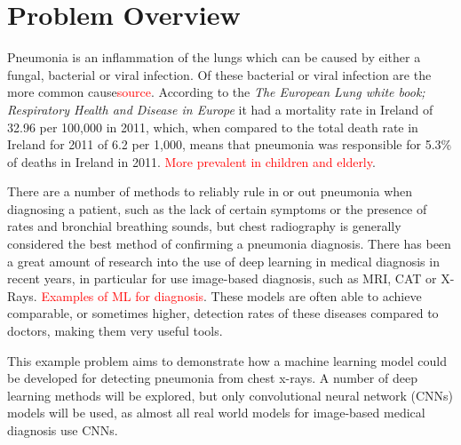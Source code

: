 \documentclass[12pt,a4paper,titlepage,twoside]{report}
\newcommand\todo[1]{\textcolor{red}{#1}}
\begin{document}
\section{Problem Overview}
	Pneumonia is an inflammation of the lungs which can be caused by either a fungal, bacterial or viral infection. Of these bacterial or viral infection are the more common cause\todo{source}. According to the \textit{The European Lung white book; Respiratory Health and Disease in Europe} it had a mortality rate in Ireland of 32.96 per 100,000 in 2011\cite{pne-death-rate}, which, when compared to the total death rate in Ireland for 2011 of 6.2 per 1,000, means that pneumonia was responsible for 5.3\% of deaths in Ireland in 2011. \todo{More prevalent in children and elderly}. \par
	There are a number of methods to reliably rule in or out pneumonia when diagnosing a patient, such as the lack of certain symptoms or the presence of rates and bronchial breathing sounds, but chest radiography is generally considered the best method of confirming a pneumonia diagnosis\cite{pne-diagnosis}. There has been a great amount of research into the use of deep learning in medical diagnosis in recent years, in particular for use image-based diagnosis, such as MRI, CAT or X-Rays\cite{pne-ml-in-medicine}. \todo{Examples of ML for diagnosis}. These models are often able to achieve comparable, or sometimes higher, detection rates of these diseases compared to doctors, making them very useful tools. \par
	This example problem aims to demonstrate how a machine learning model could be developed for detecting pneumonia from chest x-rays. A number of deep learning methods will be explored, but only convolutional neural network (CNNs) models will be used, as almost all real world models for image-based medical diagnosis use CNNs\cite{pne-ml-in-medicine}. \par
\end{document}
